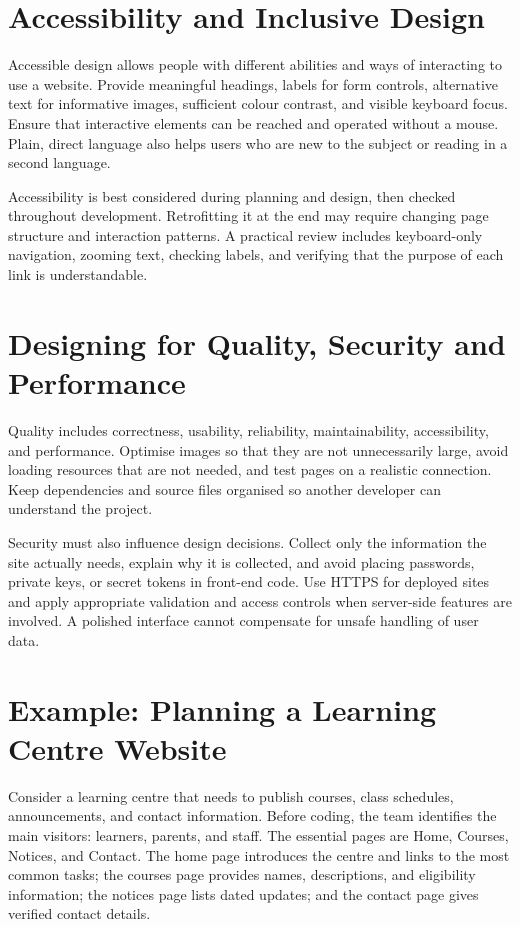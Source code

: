 \documentclass[11pt,openany,oneside]{book}
\begin{document}
\section{Accessibility and Inclusive Design}
Accessible design allows people with different abilities and ways of interacting to use a website. Provide meaningful headings, labels for form controls, alternative text for informative images, sufficient colour contrast, and visible keyboard focus. Ensure that interactive elements can be reached and operated without a mouse. Plain, direct language also helps users who are new to the subject or reading in a second language.

Accessibility is best considered during planning and design, then checked throughout development. Retrofitting it at the end may require changing page structure and interaction patterns. A practical review includes keyboard-only navigation, zooming text, checking labels, and verifying that the purpose of each link is understandable.

\section{Designing for Quality, Security and Performance}
Quality includes correctness, usability, reliability, maintainability, accessibility, and performance. Optimise images so that they are not unnecessarily large, avoid loading resources that are not needed, and test pages on a realistic connection. Keep dependencies and source files organised so another developer can understand the project.

Security must also influence design decisions. Collect only the information the site actually needs, explain why it is collected, and avoid placing passwords, private keys, or secret tokens in front-end code. Use HTTPS for deployed sites and apply appropriate validation and access controls when server-side features are involved. A polished interface cannot compensate for unsafe handling of user data.

\section{Example: Planning a Learning Centre Website}
Consider a learning centre that needs to publish courses, class schedules, announcements, and contact information. Before coding, the team identifies the main visitors: learners, parents, and staff. The essential pages are Home, Courses, Notices, and Contact. The home page introduces the centre and links to the most common tasks; the courses page provides names, descriptions, and eligibility information; the notices page lists dated updates; and the contact page gives verified contact details.
\end{document}
